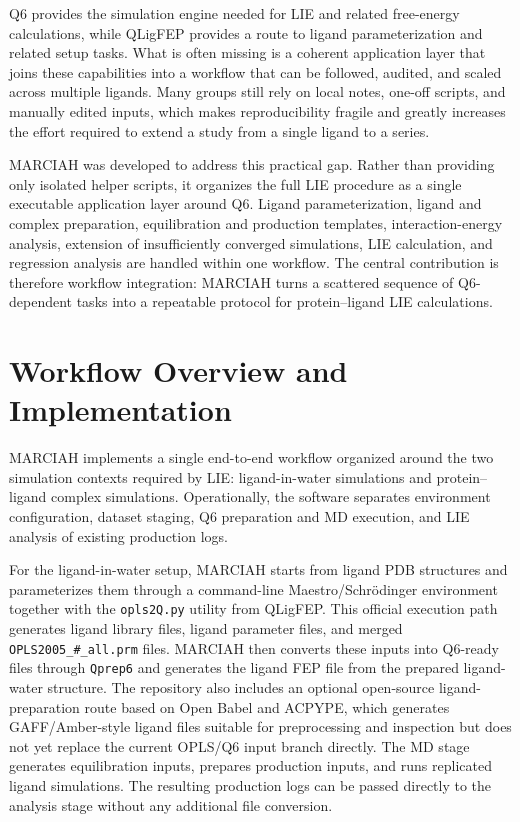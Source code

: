 \documentclass[journal=jcisd8,manuscript=article]{achemso}
\begin{document}
Q6 provides the simulation engine needed for LIE and related free-energy calculations,\cite{bauer2018q6} while QLigFEP provides a route to ligand parameterization and related setup tasks. What is often missing is a coherent application layer that joins these capabilities into a workflow that can be followed, audited, and scaled across multiple ligands. Many groups still rely on local notes, one-off scripts, and manually edited inputs, which makes reproducibility fragile and greatly increases the effort required to extend a study from a single ligand to a series.

MARCIAH was developed to address this practical gap. Rather than providing only isolated helper scripts, it organizes the full LIE procedure as a single executable application layer around Q6. Ligand parameterization, ligand and complex preparation, equilibration and production templates, interaction-energy analysis, extension of insufficiently converged simulations, LIE calculation, and regression analysis are handled within one workflow. The central contribution is therefore workflow integration: MARCIAH turns a scattered sequence of Q6-dependent tasks into a repeatable protocol for protein--ligand LIE calculations.

\section{Workflow Overview and Implementation}

MARCIAH implements a single end-to-end workflow organized around the two simulation contexts required by LIE: ligand-in-water simulations and protein--ligand complex simulations. Operationally, the software separates environment configuration, dataset staging, Q6 preparation and MD execution, and LIE analysis of existing production logs.

For the ligand-in-water setup, MARCIAH starts from ligand PDB structures and parameterizes them through a command-line Maestro/Schr\"odinger environment together with the \texttt{opls2Q.py} utility from QLigFEP. This official execution path generates ligand library files, ligand parameter files, and merged \texttt{OPLS2005\_\#\_all.prm} files. MARCIAH then converts these inputs into Q6-ready files through \texttt{Qprep6} and generates the ligand FEP file from the prepared ligand-water structure. The repository also includes an optional open-source ligand-preparation route based on Open Babel and ACPYPE, which generates GAFF/Amber-style ligand files suitable for preprocessing and inspection but does not yet replace the current OPLS/Q6 input branch directly. The MD stage generates equilibration inputs, prepares production inputs, and runs replicated ligand simulations. The resulting production logs can be passed directly to the analysis stage without any additional file conversion.
\end{document}

